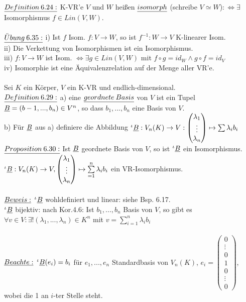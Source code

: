 \documentclass[fleqn, a4paper, 11pt]{scrartcl}
\theoremstyle{definition}
\begin{document}
$\uline{Definition\:6.24:}$ K-VR'e $V$ und $W$ heißen $\uline{isomorph}$ (schreibe $V\simeq W$)$:\Leftrightarrow\exists$ Isomorphismus $f\in Lin(V,W)$.\\
\\
$\uline{\ddot{U}bung\:6.35:}$ i) Ist $f$ Isom. $f:V\rightarrow W$, so ist $f^{-1}:W\rightarrow V$ K-linearer Isom.\\
ii) Die Verkettung von Isomorphismen ist ein Isomorphismus.\\
iii) $f:V\rightarrow W$ ist Isom. $\Leftrightarrow\exists g\in Lin(V,W)$ mit $f\circ g=id_W \wedge g\circ f=id_V$\\
iv) Isomorphie ist eine Äquivalenzrelation auf der Menge aller VR'e.\\
\\
Sei $K$ ein Körper, $V$ ein K-VR und endlich-dimensional.\\
$\uline{Definition\:6.29:}$ a) eine $\uline{geordnete\:Basis}$ von $V$ ist ein Tupel $\uline{B}=(b-1,...,b_n)\in V^n$, so dass $b_1,...,b_n$ eine Basis von $V$.\\
b) Für $\uline{B}$ aus a) definiere die Abbildung $^\iota\uline{B}:V_n(K)\rightarrow V:\begin{pmatrix}
	\lambda_1\\
	\vdots\\
	\lambda_n
\end{pmatrix} \mapsto \sum \lambda_i b_i$\\
$\uline{Proposition\:6.30:}$ Ist $\uline{B}$ geordnete Basis von $V$, so ist $^\iota\uline{B}$ ein Isomorphismus. $^\iota\uline{B}:V_n(K)\rightarrow V,\begin{pmatrix}
	\lambda_1\\
	\vdots\\
	\lambda_n
\end{pmatrix} \mapsto \sum\limits_{=1}^n \lambda_i b_i$ ein VR-Isomorphismus.\\
\\
$\uline{Beweis:}$ $^\iota\uline{B}$ wohldefiniert und linear: siehe Bsp. 6.17.\\
$^\iota\uline{B}$ bijektiv: nach Kor.4.6: Ist $b_1,...,b_n$ Basis von $V$, so gibt es $\forall v\in V:\exists!(\lambda_1,...,\lambda_n)\in K^n$ mit $v=\sum\limits_{i=1}^n \lambda_i b_i$\\
\\
$\uline{Beachte:}$ $^\iota\uline{B}(e_i)=b_i$ für $e_1,...,e_n$ Standardbasis von $V_n(K)$, $e_i=\begin{pmatrix}
	0 \\
	\vdots\\
	0\\
	1\\
	0\\
	\vdots\\
	0
\end{pmatrix}$, wobei die 1 an $i$-ter Stelle steht.\\
\end{document}
